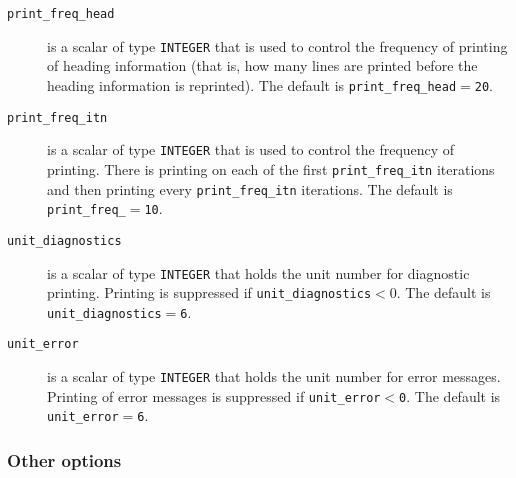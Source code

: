 \begin{description}

\item[\texttt{print\_freq\_head}] is a scalar of type  {\tt INTEGER}
that is used to control the frequency of printing 
of heading information (that is, how many
lines are printed before the heading information is reprinted). 
The default is {\tt print\_freq\_head$=$\tt 20}.

\item[\texttt{print\_freq\_itn}] is a scalar of type  {\tt INTEGER}
that is used to control the frequency of printing.
There is printing on each of the first {\tt print\_freq\_itn} iterations 
and then printing  every {\tt print\_freq\_itn}
iterations.
The default is {\tt print\_freq\_$=$\tt 10}.



\item[\texttt{unit\_diagnostics}] is a scalar  of type
{\tt INTEGER} that holds the
unit number for diagnostic printing. Printing is suppressed if
{\tt unit\_diagnostics$<0$}.
The default is {\tt unit\_diagnostics$=$6}.

\item[\texttt{unit\_error}] is a scalar of type  {\tt INTEGER} that holds the
unit number for error messages.
Printing of error messages
is suppressed if {\tt unit\_error$<$0}.
The default is {\tt unit\_error$=$6}.


\end{description}



\subsubsection*{Other options}

